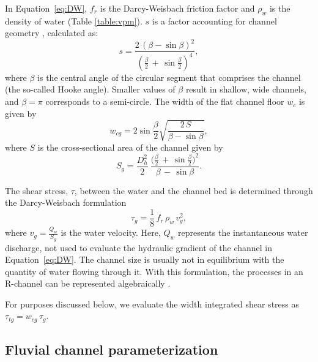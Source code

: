 \documentclass[11pt]{article}
\begin{document}
\begin{spacing}{1}
          In Equation~\ref{eq:DW}, $f_r$ is the Darcy-Weisbach friction factor and $\rho_w$ is the density of water (Table \ref{table:vpm}). $s$ is a factor accounting for channel geometry \citep{hooke1990}, calculated as:
          \begin{equation}
            \label{eq:Hf}
            s = \frac{2\,(\beta -\sin \beta)^2}{(\frac{\beta}{2}\,+\,\sin \frac{\beta}{2})^4},
          \end{equation}
          where $\beta$ is the central angle of the circular segment that comprises the channel (the so-called Hooke angle).
          Smaller values of $\beta$ result in shallow, wide channels, and $\beta =\pi$ corresponds to a semi-circle.
          The width of the flat channel floor $w_c$ is given by
          \begin{equation}
            \label{eq:dh2wc}
            w_{cg} = 2  \sin \frac{\beta}{2} \sqrt{\frac{2\, S}{\beta -\sin \beta}},
          \end{equation}
          where $S$ is the cross-sectional area of the channel given by
          \begin{equation}
            \label{eq:dh2S}
            S_g =  \frac{D_h^2}{2}~ \frac{\Big(\frac{\beta}{2} \,+ \, \sin \frac{\beta}{2}\Big)^2  }{\beta\,-\,\sin \beta}.
          \end{equation}
          
          The shear stress, $\tau$, between the water and the channel bed is determined through the Darcy-Weisbach formulation
          \begin{equation}
            \label{eq:tau}
            \tau_g=\frac{1}{8}\,f_r\,\rho_w\,v_g^2,
          \end{equation}
          where $v_g = \frac{Q_w}{S_g}$ is the water velocity.
          Here, $Q_w$ represents the instantaneous water discharge, not used to evaluate the hydraulic gradient of the channel in Equation~\ref{eq:DW}.
          The channel size is usually not in equilibrium with the quantity of water flowing through it.
          With this formulation, the processes in an R-channel can be represented algebraically \citep{delaney2019}.
        
          For purposes discussed below, we evaluate the width integrated shear stress as $\tau_{tg}=w_{cg}\,\tau_g $.
        
          \subsection{Fluvial channel  parameterization}
          \label{sect:fluv}
          

\end{spacing}
\end{document}
